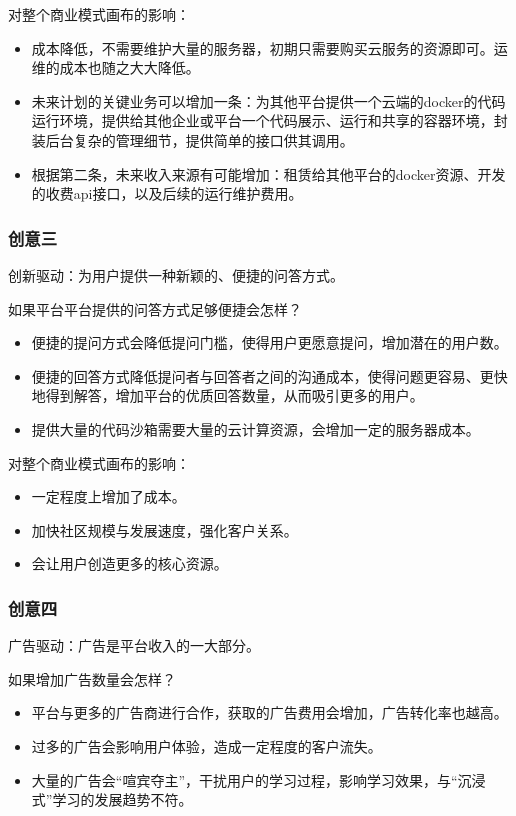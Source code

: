 \documentclass[a4paper]{ctexart}
\begin{document}
对整个商业模式画布的影响：
\begin{itemize}
  \item 成本降低，不需要维护大量的服务器，初期只需要购买云服务的资源即可。运维的成本也随之大大降低。
  \item 未来计划的关键业务可以增加一条：为其他平台提供一个云端的docker的代码运行环境，提供给其他企业或平台一个代码展示、运行和共享的容器环境，封装后台复杂的管理细节，提供简单的接口供其调用。
  \item 根据第二条，未来收入来源有可能增加：租赁给其他平台的docker资源、开发的收费api接口，以及后续的运行维护费用。
\end{itemize}

\subsubsection{创意三}
创新驱动：为用户提供一种新颖的、便捷的问答方式。

如果平台平台提供的问答方式足够便捷会怎样？
\begin{itemize}
  \item 便捷的提问方式会降低提问门槛，使得用户更愿意提问，增加潜在的用户数。
  \item 便捷的回答方式降低提问者与回答者之间的沟通成本，使得问题更容易、更快地得到解答，增加平台的优质回答数量，从而吸引更多的用户。
  \item 提供大量的代码沙箱需要大量的云计算资源，会增加一定的服务器成本。
\end{itemize}

对整个商业模式画布的影响：
\begin{itemize}
  \item 一定程度上增加了成本。
  \item 加快社区规模与发展速度，强化客户关系。
  \item 会让用户创造更多的核心资源。
\end{itemize}

\subsubsection{创意四}
广告驱动：广告是平台收入的一大部分。

如果增加广告数量会怎样？
\begin{itemize}
  \item 平台与更多的广告商进行合作，获取的广告费用会增加，广告转化率也越高。
  \item 过多的广告会影响用户体验，造成一定程度的客户流失。
  \item 大量的广告会“喧宾夺主”，干扰用户的学习过程，影响学习效果，与“沉浸式”学习的发展趋势不符。
\end{itemize}
\end{document}
